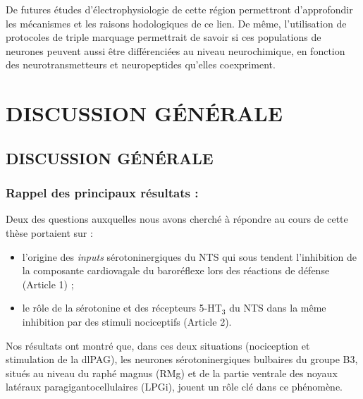 \documentclass[a4paper,12pt,twoside]{report}
\begin{document}
De futures études d’électrophysiologie de cette région permettront d’approfondir les mécanismes et les raisons hodologiques de ce lien. De même, l’utilisation de protocoles de triple marquage permettrait de savoir si ces populations de neurones peuvent aussi être différenciées au niveau neurochimique, en fonction des neurotransmetteurs et neuropeptides qu’elles coexpriment.

\cleardoublepage

\fancyhf{} %
\fancyfoot[C]{\bfseries -\thepage-}
\renewcommand{\headrulewidth}{1pt}
\renewcommand{\footrulewidth}{1pt}
\addtolength{\headheight}{1pt} %

\part{DISCUSSION GÉNÉRALE}

\cleardoublepage

\chapter{DISCUSSION GÉNÉRALE}

\section{Rappel des principaux résultats :}

Deux des questions auxquelles nous avons cherché à répondre au cours de cette thèse portaient sur :

\begin{itemize}
\item l’origine des \textit{inputs} sérotoninergiques du NTS qui sous tendent l’inhibition de la composante cardiovagale du baroréflexe lors des réactions de défense (Article 1) ;
\item le rôle de la sérotonine et des récepteurs 5-HT$_{3}$ du NTS dans la même inhibition par des stimuli nociceptifs (Article 2).\end{itemize}

Nos résultats ont montré que, dans ces deux situations (nociception et stimulation de la dlPAG), les neurones sérotoninergiques bulbaires du groupe B3, situés au niveau du raphé magnus (RMg) et de la partie ventrale des noyaux latéraux paragigantocellulaires (LPGi), jouent un rôle clé dans ce phénomène. 
\end{document}
